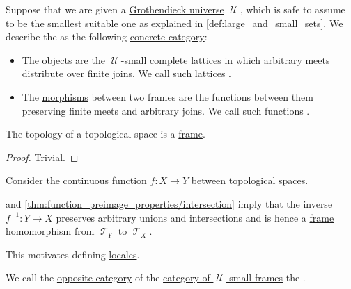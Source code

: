 \begin{definition}\label{def:category_of_small_frames}
  Suppose that we are given a \hyperref[def:grothendieck_universe]{Grothendieck universe} \( \mscrU \), which is safe to assume to be the smallest suitable one as explained in \cref{def:large_and_small_sets}. We describe the  as the following \hyperref[rem:concrete_categories]{concrete category}:

  \begin{itemize}
    \item The \hyperref[def:category/objects]{objects} are the \( \mscrU \)-small \hyperref[def:complete_lattice]{complete lattices} in which arbitrary meets distribute over finite joins. We call such lattices .

    \item The \hyperref[def:category/morphisms]{morphisms} between two frames are the functions between them preserving finite meets and arbitrary joins. We call such functions .
  \end{itemize}
\end{definition}

\begin{proposition}\label{thm:topological_spaces_are_frames}
  The topology of a topological space is a \hyperref[def:category_of_small_frames]{frame}.
\end{proposition}
\begin{proof}
  Trivial.
\end{proof}

\begin{remark}\label{rem:topology_frame_homomorphism}
  Consider the continuous function \( f: X \to Y \) between topological spaces.

   and \cref{thm:function_preimage_properties/intersection} imply that the inverse \( f^{-1}: Y \to X \) preserves arbitrary unions and intersections and is hence a \hyperref[def:category_of_small_frames]{frame homomorphism} from \( \mscrT_Y \) to \( \mscrT_X \).

  This motivates defining \hyperref[def:category_of_small_locales]{locales}.
\end{remark}

\begin{definition}\label{def:category_of_small_locales}
  We call the \hyperref[def:opposite_category]{opposite category} of the \hyperref[def:category_of_small_frames]{category of \( \mscrU \)-small frames} the .
\end{definition}

